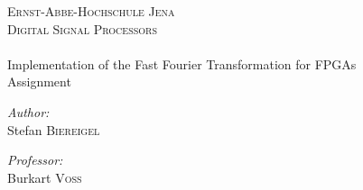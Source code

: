 \begin{titlepage}
\vspace*{\fill}
\begin{center}
	\textsc{\LARGE Ernst-Abbe-Hochschule Jena} \\ [1.5cm]

	\textsc{\Large Digital Signal Processors} \\ [0.5cm]

	\HRule \\ [0.3cm]
	{\LARGE Implementation of the Fast Fourier Transformation for FPGAs}\\	[0.3cm]
	{\Large Assignment}
	\HRule \\ [1 cm]

	\begin{minipage}{0.4\textwidth}
		\begin{flushleft} \large
			\emph{Author:}\\
			Stefan \textsc{Biereigel}\\
		\end{flushleft}
	\end{minipage}
	\begin{minipage}{0.4\textwidth}
		\begin{flushright} \large
			\emph{Professor:}\\
			Burkart \textsc{Voß}\\
		\end{flushright}
	\end{minipage}

\end{center}
\vspace*{\fill}
\end{titlepage}
